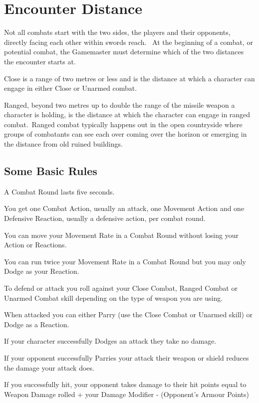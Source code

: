 \section{Encounter Distance}
Not all combats start with the two sides, the players and their opponents, directly facing each other within swords reach.  At the beginning of a combat, or potential combat, the Gamemaster must determine which of the two distances the encounter starts at.

Close is a range of two metres or less and is the distance at which a character can engage in either Close or Unarmed combat. 

Ranged, beyond two metres up to double the range of the missile weapon a character is holding, is the distance at which the character can engage in ranged combat. Ranged combat typically happens out in the open countryside where groups of combatants can see each over coming over the horizon or emerging in the distance from old ruined buildings.


\subsection{Some Basic Rules}
\begin{rpg-list}
\item A Combat Round lasts five seconds.

\item You get one Combat Action, usually an attack, one Movement Action and one Defensive Reaction, usually a defensive action, per combat round.

\item You can move your Movement Rate in a Combat Round without losing your Action or Reactions. 

\item You can run twice your Movement Rate in a Combat Round but you may only Dodge as your Reaction.

\item To defend or attack you roll against your Close Combat, Ranged Combat or Unarmed Combat skill depending on the type of weapon you are using.

\item When attacked you can either Parry (use the Close Combat or Unarmed skill) or Dodge as a Reaction.

\item If your character successfully Dodges an attack they take no damage.

\item If your opponent successfully Parries your attack their weapon or shield reduces the damage your attack does.

\item If you successfully hit, your opponent takes damage to their hit points equal to 
	Weapon Damage rolled + your Damage Modifier - (Opponent’s Armour Points)
\end{rpg-list}

